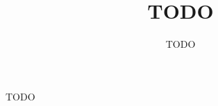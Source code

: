 \documentclass[a4paper]{article}
\title{TODO}
\author{TODO}
\begin{document}
\maketitle

TODO
\end{document}
